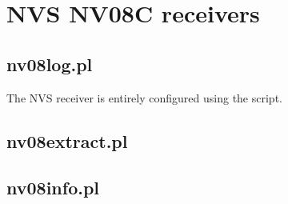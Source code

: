 \section{NVS NV08C receivers}

\subsection{nv08log.pl}
\hypertarget{h:nvslog}{}

The NVS receiver is entirely configured using the script.

\subsection{nv08extract.pl}

\hypertarget{h:nv08extract}{}

\subsection{nv08info.pl}

\hypertarget{h:nv08info}{}
